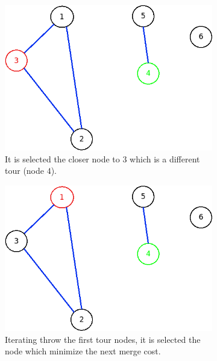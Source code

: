 \begin{figure}[!h]
\begin{subfigure}{.26\columnwidth}
		\includegraphics[width=\columnwidth]{img/patching3.png}
		\caption{It is selected the closer node to $ 3 $ which is a different tour (node $ 4 $).}
		\label{fig:patching3}
	\end{subfigure}
	\begin{subfigure}{.26\columnwidth}
		\includegraphics[width=\columnwidth]{img/patching4.png}
		\caption{Iterating throw the first tour nodes, it is selected the node which minimize the next merge cost.}
		\label{fig:patching4}
	\end{subfigure}
\hfill%
	\begin{subfigure}{.26\columnwidth}

\end{subfigure}
\end{figure}
